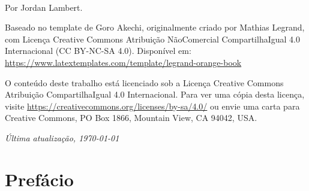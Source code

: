 

\thispagestyle{empty} %

~\vfill %

\noindent Por Jordan Lambert.

\vspace{.5cm}
\noindent 

\noindent Baseado no template de Goro Akechi, originalmente criado por Mathias Legrand, com Licença Creative Commons Atribuição NãoComercial CompartilhaIgual 4.0 Internacional (CC BY-NC-SA 4.0). Disponível em: \url{https://www.latextemplates.com/template/legrand-orange-book} %

\vspace{.5cm}


\vspace{.5cm}
\noindent O conteúdo deste trabalho está licenciado sob a Licença Creative Commons Atribuição CompartilhaIgual 4.0 Internacional. Para ver uma cópia desta licença, visite
\url{https://creativecommons.org/licenses/by-sa/4.0/} ou envie uma carta para Creative Commons, PO Box 1866, Mountain View, CA 94042, USA. %

\vspace{.5cm}
\noindent \textit{Última atualização, \today} %


\pagestyle{empty} %

\chapter*{Prefácio}

